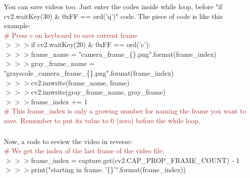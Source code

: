 \documentclass[a4paper,18pt]{article}
\begin{document}
{{{{{%

\subsubsection{\colorbox {important}{\color{white}{\large How to save desired frames}}}
You can save videos too. Just enter the codes inside while loop, before "if cv2.waitKey(30) \& 0xFF == ord('q')" code. The piece of code is like this example:\\

{\textcolor{brown}{\# Press c on keyboard to save current frame}}\\
\hspace*{14pt}$>>>$if cv2.waitKey(20) \& 0xFF == ord('c'):\\
\hspace*{14pt}$>>>$frame\_name = "camera\_frame\_\{\}.png".format(frame\_index)\\
\hspace*{14pt}$>>>$gray\_frame\_name = "grayscale\_camera\_frame\_\{\}.png".format(frame\_index)\\
\hspace*{14pt}$>>>$cv2.imwrite(frame\_name, frame)\\
\hspace*{14pt}$>>>$cv2.imwrite(gray\_frame\_name, gray\_frame)\\
\hspace*{14pt}$>>>$frame\_index += 1\\{\textcolor{brown}{\# This frame\_index is only a growing number for naming the frame you want to save. Remember to put its value to 0 (zero) before the while loop.}}\\


\subsubsection{\colorbox {important}{\color{white}{\large How to backward-play a video }}}
Now, a code to review the video in reverse:\\

{\textcolor{brown}{\# We get the index of the last frame of the video file:}\\
\hspace*{14pt}$>>>$frame\_index = capture.get(cv2.CAP\_PROP\_FRAME\_COUNT) - 1\\
\hspace*{14pt}$>>>$print("starting in frame: '\{\}'".format(frame\_index))\\

}}}}}}
\end{document}
